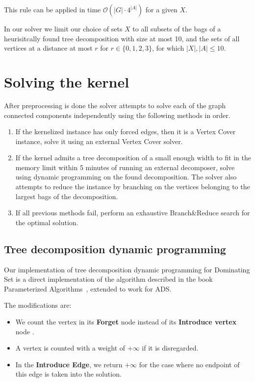 \documentclass[a4paper,UKenglish,cleveref, autoref, thm-restate]{lipics-v2021}
\begin{document}
This rule can be applied in time $\mathcal{O}(|G| \cdot 4^{|A|})$ for a given $X$.

In our solver we limit our choice of sets $X$ to all subsets of the bags of a heurisitcally found tree decomposition with size at most 10, and the sets of all vertices at a distance at most $r$ for $r \in \{0, 1, 2, 3\}$, for which  $|X|, |A| \leq 10$.

\section{Solving the kernel}
After preprocessing is done the solver attempts to solve each of the graph connected components independently using the following methods in order.
\begin{enumerate} 
    \item If the kernelized instance has only forced edges, then it is a Vertex Cover instance, solve it using an external Vertex Cover solver.
    \item If the kernel admits a tree decomposition of a small enough width to fit in the memory limit within 5 minutes of running an external decomposer, solve using dynamic programming on the found decomposition.
    The solver also attempts to reduce the instance by branching on the vertices belonging to the largest bags of the decomposition.
    \item If all previous methods fail, perform an exhaustive Branch\&Reduce search for the optimal solution.
\end{enumerate}

\subsection{Tree decomposition dynamic programming}
Our implementation of tree decomposition dynamic programming for Dominating Set is a direct implementation of the algorithm described in the book Parameterized Algorithms~\cite{DBLP:books/sp/CyganFKLMPPS15}, 
extended to work for ADS. 

The modifications are:
\begin{itemize}
    \item We count the vertex in its \textbf{Forget} node instead of its \textbf{Introduce vertex} node .
    \item A vertex is counted with a weight of $+\infty$ if it is disregarded.
    \item In the \textbf{Introduce Edge}, we return $+\infty$ for the case where no endpoint of this edge is taken into the solution.
\end{itemize}
\end{document}
